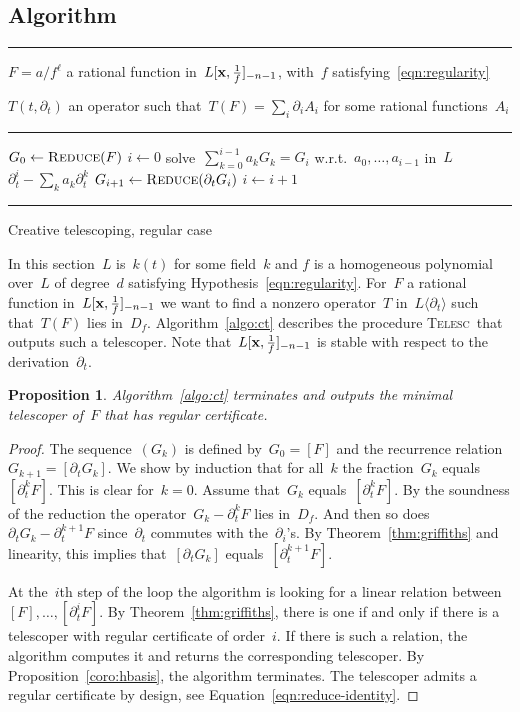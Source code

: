 \documentclass{sig-alternate}
\newtheorem{prop}[thm]{Proposition}
\newenvironment{algoenv}[3][\linewidth]{
\begin{minipage}{#1}\flushleft
\rule{\textwidth}{.08em}\vspace{-\baselineskip}\smallskip
\begin{description}[noitemsep]
\item[\rlap{Input}\phantom{Output}] #2
\item[Output] #3
\end{description}
\vspace{-\baselineskip}
\rule{\textwidth}{.05em}
\begin{algorithmic}
}{\end{algorithmic}
\vspace{-.5\baselineskip}
\rule{\textwidth}{.08em}
\end{minipage}}
\newcommand{\Reduce}{\mathop{\textsc{Reduce}}}
\newcommand{\tCreatTel}{\textsc{Telesc}}
\newcommand{\mop}[1]{\operatorname{#1}}
\newcommand{\xx}{\mathbf{x}}
\newcommand{\Lxfp}{\Lxf_{\smash{-n-1}}}
\newcommand{\Lxf}{L[\xx,\smash{\tfrac{1}{f}}]}
\begin{document}
\subsection{Algorithm}\label{sec:ct-algo}
\begin{algo}
\centering
\begin{algoenv}{
    $F = a/f^\ell$ a rational function in~$\Lxfp$, with~$f$ satisfying~\eqref{eqn:regularity}
  }{$T(t,\partial_t)$ an operator such that~$T(F) = \sum_i\partial_iA_i$ for some rational functions~$A_i$}
  \Procedure{\tCreatTel}{$F$}
    \State $G_0\gets \Reduce(F)$ 
\State $i\gets 0$
    \Loop
    \If{$\mop{rank}_L(G_0,\dotsc,G_i) < i+1$}
      \State solve~$\sum_{k=0}^{i-1} a_k G_k = G_i$ w.r.t.~$a_0, \dotsc, a_{i-1}$ in~$L$
      \State \Return $\partial_t^i - \sum_k a_k\partial_t^k$
    \Else
      \State $G_{i+1} \gets \Reduce(\partial_t G_{i})$
      \State $i\gets i+1$
    \EndIf
    \EndLoop
  \EndProcedure
\end{algoenv}
\caption{Creative telescoping, regular case}
\label{algo:ct}
\end{algo}


\noindent In this section~$L$ is~$k(t)$ for some field~$k$ and $f$ is a homogeneous polynomial over~$L$ of degree~$d$ satisfying Hypothesis~\eqref{eqn:regularity}. 
For~$F$ a rational function in~$\Lxfp$ we want to find a nonzero operator~$T$ in~$L\langle \partial_t \rangle$ such that~$T(F)$ lies in~$D_f$.
Algorithm~\ref{algo:ct} describes the procedure \tCreatTel\ that outputs such a telescoper.
Note that~$\Lxfp$ is stable with respect to the derivation~$\partial_t$.

\begin{prop}
Algorithm~\ref{algo:ct} terminates and outputs the minimal telescoper of~$F$ that has regular certificate.
\end{prop}

\begin{proof}
The sequence~$(G_k)$ is defined by~$G_0 = [F]$ and the recurrence relation~$G_{k+1} = [\partial_t G_k]$.
We show by induction that for all~$k$ the fraction~$G_k$ equals~$[ \partial_t^k F]$.
This is clear for~$k=0$. Assume that~$G_k$ equals~$[ \partial_t^k F]$.
By the soundness of the reduction the operator~$G_k  - \partial^k_t F$ lies in~$D_f$. 
And then so does~$\partial_t G_k - \partial_t^{k+1} F$ since~$\partial_t$ commutes with the~$\partial_i$'s.
By Theorem~\ref{thm:griffiths} and linearity, this implies that~$[\partial_t G_k]$ equals~$[ \partial_t^{k+1} F]$.

At the~$i$th step of the loop the algorithm is looking for a linear relation between~$[F],\dotsc,[\partial^i_t F]$.
By Theorem~\ref{thm:griffiths}, there is one if and only if there is a telescoper with regular certificate of order~$i$.
If there is such a relation, the algorithm computes it and returns the corresponding telescoper.
By Proposition~\ref{coro:hbasis}, the algorithm terminates.
The telescoper admits a regular certificate by design, see Equation~\eqref{eqn:reduce-identity}.
\end{proof}
\end{document}
